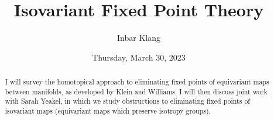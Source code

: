 \documentclass{UAmathtalk}
\author{Inbar Klang}
\title{Isovariant Fixed Point Theory}
\date{Thursday, March 30, 2023}
\begin{document}
\maketitle

\begin{abstract}
I will survey the homotopical approach to eliminating fixed points of equivariant maps between manifolds, as developed by Klein and Williams. I will then discuss joint work with Sarah Yeakel, in which we study obstructions to eliminating fixed points of isovariant maps (equivariant maps which preserve isotropy groups).
\end{abstract}
\end{document}
